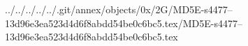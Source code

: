 ../../../../../.git/annex/objects/0x/2G/MD5E-s4477--13d96e3ea523d4d6f8abdd54be0c6bc5.tex/MD5E-s4477--13d96e3ea523d4d6f8abdd54be0c6bc5.tex